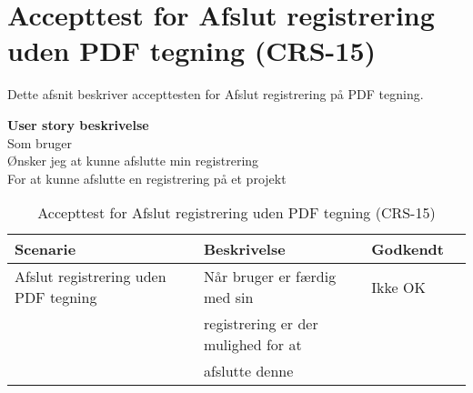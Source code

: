 \section{Accepttest for Afslut registrering uden PDF tegning (CRS-15)}
Dette afsnit beskriver accepttesten for Afslut registrering på PDF tegning.

\textbf{User story beskrivelse} \\
Som bruger \\
Ønsker jeg at kunne afslutte min registrering \\
For at kunne afslutte en registrering på et projekt

\begin{table}[H]
	\centering
	\begin{tabular}{|ll|l|ll|} \hline
		\textbf{Scenarie} &  & \textbf{Beskrivelse}&  \textbf{Godkendt}&  \\ \hline
		Afslut registrering uden PDF tegning&  &  Når bruger er færdig med sin &  Ikke OK&  \\
		& & registrering er der mulighed for at& & \\
		& & afslutte denne& & \\ \hline
	\end{tabular}
	\caption{Accepttest for Afslut registrering uden PDF tegning (CRS-15)}
	\label{AcceptAfslutUdenPDF}
\end{table}